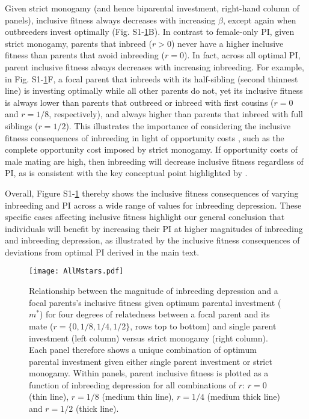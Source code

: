 \documentclass[12pt]{article}
\begin{document}
Given strict monogamy (and hence biparental investment, right-hand column of panels), inclusive fitness always decreases with increasing $\beta$, except again when outbreeders invest optimally (Fig. S1-\ref{AllMstars}B). In contrast to female-only PI, given strict monogamy, parents that inbreed ($r>0$) never have a higher inclusive fitness than parents that avoid inbreeding ($r=0$). In fact, across all optimal PI, parent inclusive fitness always decreases with increasing inbreeding. For example, in Fig. S1-\ref{AllMstars}F, a focal parent that inbreeds with its half-sibling (second thinnest line) is investing optimally while all other parents do not, yet its inclusive fitness is always lower than parents that outbreed or inbreed with first cousins ($r=0$ and $r=1/8$, respectively), and always higher than parents that inbreed with full siblings ($r=1/2$). This illustrates the importance of considering the inclusive fitness consequences of inbreeding in light of opportunity costs \cite[][]{Waser1986}, such as the complete opportunity cost imposed by strict monogamy. If opportunity costs of male mating are high, then inbreeding will decrease inclusive fitness regardless of PI, as is consistent with the key conceptual point highlighted by \cite{Waser1986}.

Overall, Figure S1-\ref{AllMstars} thereby shows the inclusive fitness consequences of varying inbreeding and PI across a wide range of values for inbreeding depression. These specific cases affecting inclusive fitness highlight our general conclusion that individuals will benefit by increasing their PI at higher magnitudes of inbreeding and inbreeding depression, as illustrated by the inclusive fitness consequences of deviations from optimal PI derived in the main text.

\clearpage

\begin{figure}[H]
\begin{center}				
\texttt{[image: AllMstars.pdf]}
\end{center}
\caption{Relationship between the magnitude of inbreeding depression and a focal parents's inclusive fitness given optimum parental investment ($m^{*}$) for four degrees of relatedness between a focal parent and its mate ($r=\{0, 1/8, 1/4, 1/2\}$, rows top to bottom) and single parent investment (left column) versus strict monogamy (right column). Each panel therefore shows a unique combination of optimum parental investment given either single parent investment or strict monogamy. Within panels, parent inclusive fitness is plotted as a function of inbreeding depression for all combinations of $r$: $r=0$ (thin line), $r=1/8$ (medium thin line), $r=1/4$ (medium thick line) and $r=1/2$ (thick line).}
\label{AllMstars}
\end{figure}

\clearpage



\end{document}
